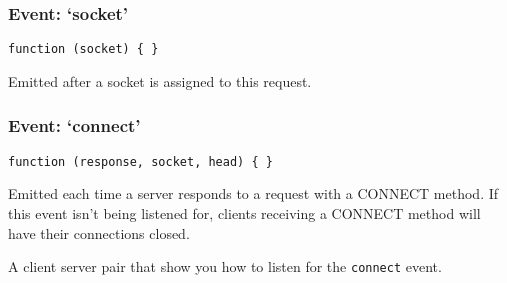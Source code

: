 \subsubsection{Event: `socket'}

\texttt{function (socket) \{ \}}

Emitted after a socket is assigned to this request.

\subsubsection{Event: `connect'}

\texttt{function (response, socket, head) \{ \}}

Emitted each time a server responds to a request with a CONNECT method.
If this event isn't being listened for, clients receiving a CONNECT
method will have their connections closed.

A client server pair that show you how to listen for the
\texttt{connect} event.

